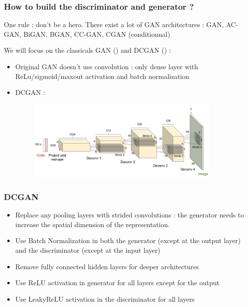 \documentclass[french,9pt]{beamer}
\begin{document}
\begin{frame}
\frametitle{How to build the discriminator and generator ? }
One rule : don't be a hero. There exist a lot of GAN architectures : GAN, AC-GAN, BiGAN, BGAN, CC-GAN, CGAN (conditionnal)

 We will focus on the classicals GAN (\cite{googfellow2014}) and DCGAN (\cite{2015arXiv151106434R}) :
 
 \begin{itemize}
 \item Original GAN doesn't use convolution : only dense layer with ReLu/sigmoid/maxout activation and batch normalization
 \item DCGAN :
 \begin{figure}
  \begin{center}
    \includegraphics[width=0.9\textwidth]{fig/dcgan_generator.png}
  \end{center}
\end{figure}
 \end{itemize}
 

\end{frame}

\begin{frame}
\frametitle{DCGAN}

\begin{itemize}
\item Replace any pooling layers with strided convolutions : the generator needs to increase the spatial dimension of the representation.
\item Use Batch Normalization in both the generator (except at the output layer) and the discriminator (except at the input layer)
\item Remove fully connected hidden layers for deeper architectures
\item Use ReLU activation in generator for all layers except for the output
\item Use LeakyReLU activation in the discriminator for all layers
\end{itemize}

\end{frame}
\end{document}
